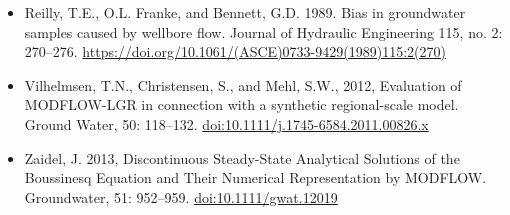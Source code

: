 \documentclass[11pt,twoside,twocolumn]{usgsreport}
\begin{document}
\begin{itemize}
\item Reilly, T.E., O.L. Franke, and Bennett, G.D. 1989. Bias in groundwater samples caused by wellbore flow. Journal of Hydraulic Engineering 115, no. 2: 270--276. \url{https://doi.org/10.1061/(ASCE)0733-9429(1989)115:2(270)}

\item Vilhelmsen, T.N., Christensen, S., and Mehl, S.W., 2012, Evaluation of MODFLOW-LGR in connection with a synthetic regional-scale model. Ground Water, 50: 118--132. \href{https://doi.org/10.1111/j.1745-6584.2011.00826.x}{doi:10.1111/j.1745-6584.2011.00826.x}

\item Zaidel, J. 2013, Discontinuous Steady-State Analytical Solutions of the Boussinesq Equation and Their Numerical Representation by MODFLOW. Groundwater, 51: 952--959. \href{https://doi.org/10.1111/gwat.12019}{doi:10.1111/gwat.12019}
\end{itemize}


\justifying
\vspace*{\fill}
\clearpage
\pagestyle{backofreport}
\makebackcover
\end{document}
